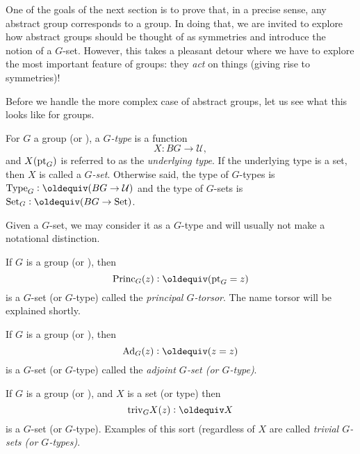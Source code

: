 One of the goals of the next section is to prove that, in a precise sense, any abstract group corresponds to a group.  In doing that, we are invited to explore how abstract groups should be thought of as symmetries and introduce the notion of a $G$-set.  However, this takes a pleasant detour where we have to explore the most important feature of groups: they \emph{act} on things (giving rise to symmetries)!

Before we handle the more complex case of abstract groups, let us see what this looks like for groups.

\begin{definition}
  For $G$ a group (or \inftygp), a \emph{$G$-type} is a function
  $$X\colon BG\to\mathcal U,$$
and $X({\mathord{\mathrm{pt}}}_G)$ is referred to as the \emph{underlying type}.
If the underlying type is a set, then $X$ is called a \emph{$G$-set}.
Otherwise said, the type of $G$-types is $\Type_G\defequi(BG\to\mathcal U)$ and the type of $G$-sets is $\Set_G\defequi(BG\to\Set)$.
\end{definition}
Given a $G$-set, we may consider it as a $G$-type and will usually not make a notational distinction.

\begin{example}\label{def:principaltorsor}
  If $G$ is a group (or \inftygp), then
$$\princ_G(z)\defequi(\pt_G=z)$$ is a $G$-set (or $G$-type) called the \emph{principal $G$-torsor}.  The name torsor will be explained shortly.
\end{example}

\newcommand{\Ad}{\mathrm{Ad}}
\begin{example}\label{def:adjointrep}
  If $G$ is a group (or \inftygp), then
$$\Ad_G(z)\defequi(z=z)$$ is a $G$-set (or $G$-type) called the \emph{adjoint $G$-set (or $G$-type)}.
\end{example}
\begin{example}\label{def:trivGset}
  If $G$ is a group (or \inftygp), and $X$ is a set (or type) then
$$\mathrm{triv}_GX(z)\defequi X$$ is a $G$-set (or $G$-type).  Examples of this sort (regardless of $X$ are called \emph{trivial $G$-sets (or $G$-types)}.
\end{example}


